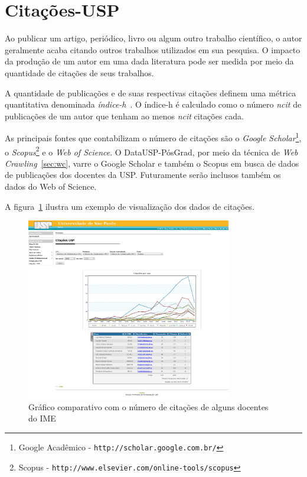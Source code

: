 \section{Citações-USP}
\label{sec:cita}
Ao publicar um artigo, periódico, livro ou algum outro trabalho científico, o autor geralmente acaba citando outros trabalhos utilizados em sua pesquisa. O impacto da produção de um autor em uma dada literatura pode ser medida por meio da quantidade de citações de seus trabalhos.
\par A quantidade de publicações e de suas respectivas citações definem uma métrica quantitativa denominada \emph{índice-h}~\cite{h-index}. O índice-h é calculado como o número \emph{ncit} de publicações de um autor que tenham ao menos \emph{ncit} citações cada.
\par As principais fontes que contabilizam o número de citações são o \emph{Google Scholar}\footnote{Google Acadêmico - \texttt{http://scholar.google.com.br/}}, o \emph{Scopus}\footnote{Scopus - \texttt{http://www.elsevier.com/online-tools/scopus}} e o \emph{Web of Science}. O DataUSP-PósGrad, por meio da técnica de \emph{Web Crawling}~\ref{sec:wc}, varre o Google Scholar e também o Scopus em busca de dados de publicações dos docentes da USP. Futuramente serão inclusos também os dados do Web of Science.
\par
A figura~\ref{fig:cit} ilustra um exemplo de visualização dos dados de citações.

\begin{figure}[H]
    \centering \includegraphics[width=0.8\textwidth]{figuras/dtausp_citacoes}
    \caption{Gráfico comparativo com o número de citações de alguns docentes do IME}
    \label{fig:cit}
\end{figure} 

